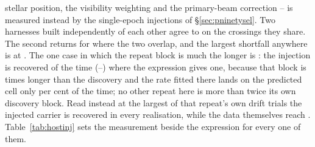stellar position, the visibility weighting and the primary-beam correction --
is measured instead by the single-epoch injections of
\S\ref{sec:pninetysel}. Two harnesses built independently of each other agree
to \HjCrossDev{} on the crossings they share.
The second returns \RjMeasCp{} for \EvBStar{} where the two overlap, and the
largest shortfall anywhere is \HjDevMaxOther{} at \HjDevStarOther. The one
case in which the repeat block is much the longer is \HjEtaStar: the
injection is recovered \HjEtaMeas{} of the time (\HjEtaLo--\HjEtaHi) where
the expression gives one, because that block is \HjEtaLenRatio{} times longer
than the discovery and the rate fitted there lands on the predicted cell only
\HjEtaFracOkPct{} per cent of the time; no other repeat here is more than
twice its own discovery block. Read instead at the largest of that repeat's
own drift trials the injected carrier is recovered in every realisation,
while the data themselves reach \HjEtaMaxReal.
Table~\ref{tab:hostinj} sets the measurement beside the expression for every
one of them.

\begin{table}
\centering
\caption{\textbf{What an injected carrier at the trigger amplitude is
recovered at}, for each of the \HjNMeas{} crossings that carry an exclusion,
ordered by what is measured. Every realisation was deposited in the retained
per-integration spectra of the real data -- the discovery block and the
$n_{\rm rep}$ covering repeat blocks, \GpNRoleInj{} windows in all -- and none
used synthetic noise. $\nu_\star$ is the crossing's frequency in the
star's own rest frame, $\Phi$ the chance the expression above gives, and
beside it the fraction of $N$ realisations of the frozen reading that
recovered the carrier, with its binomial interval. The leading
\HjNPowerLo{} rows are the crossings reported untested and not excluded.}
\label{tab:hostinj}
\scriptsize

\end{table}


